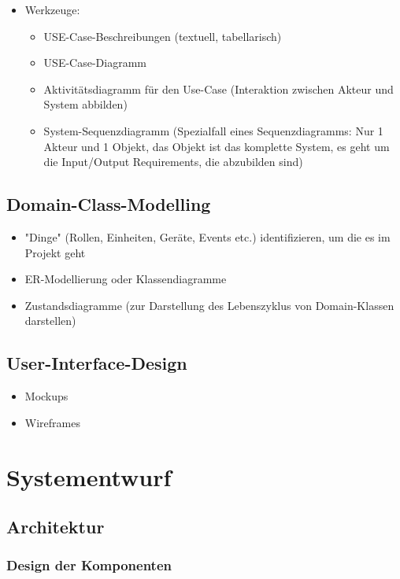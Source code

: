 \begin{itemize}
\begin{itemize}
	\end{itemize}
	\item Werkzeuge:
	\begin{itemize}
		\item USE-Case-Beschreibungen (textuell, tabellarisch)
		\item USE-Case-Diagramm
		\item Aktivitätsdiagramm für den Use-Case (Interaktion zwischen Akteur und System abbilden)
		\item System-Sequenzdiagramm (Spezialfall eines Sequenzdiagramms: Nur 1 Akteur und 1 Objekt, das Objekt ist das komplette System, es geht um die Input/Output Requirements, die abzubilden sind)
	\end{itemize}
\end{itemize}

\section{Domain-Class-Modelling}
\begin{itemize}
	\item "Dinge" (Rollen, Einheiten, Geräte, Events etc.) identifizieren, um die es im Projekt geht
	\item ER-Modellierung oder Klassendiagramme
	\item Zustandsdiagramme (zur Darstellung des Lebenszyklus von Domain-Klassen darstellen)
\end{itemize}

\section{User-Interface-Design}
\begin{itemize}
	\item Mockups
	\item Wireframes
\end{itemize}


\chapter{Systementwurf}

\section{Architektur}

\subsection{Design der Komponenten}

